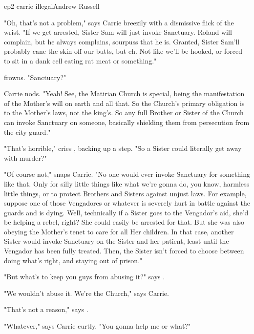\documentclass{book}
\begin{document}
\begin{childnode}{ep2 carrie illegal}{Andrew Russell}


    "Oh, that's not a problem," says Carrie breezily with a dismissive flick of the wrist. "If we get arrested, Sister Sam will just invoke Sanctuary. Roland will complain, but he always
    complains, sourpuss that he is. Granted, Sister Sam'll probably cane the skin off our butts, but eh. Not like we'll be hooked, or forced to sit in a dank cell eating rat meat or something." 

    \name{} frowns. "Sanctuary?"

    Carrie nods. "Yeah! See, the Matirian Church is special, being the manifestation of the Mother's will on earth and all that. So the Church's primary obligation is to the Mother's laws, not 
    the king's. So any full Brother or Sister of the Church can invoke Sanctuary on someone, basically shielding them from persecution from the city guard."

    "That's horrible," cries \name{}, backing up a step. "So a Sister could literally get away with murder?"

    "Of course not," snaps Carrie. "No one would ever invoke Sanctuary for something like that. Only for silly little things like what we're gonna do, you know, harmless little things, or 
    to protect Brothers and Sisters against unjust laws. For example, suppose one of those Vengadores or whatever is severely hurt in battle against the guards and is dying. Well, technically if
    a Sister goes to the Vengador's aid, she'd be helping a rebel, right? She could easily be arrested for that. But she was also obeying the Mother's tenet to care for all Her children. In that 
    case, another Sister would invoke Sanctuary on the Sister and her patient, least until the Vengador has been fully treated. Then, the Sister isn't forced to choose between doing
    what's right, and staying out of prison."

    "But what's to keep you guys from abusing it?" says \name{}.

    "We wouldn't abuse it. We're the Church," says Carrie.

    "That's not a reason," says \name{}.

    "Whatever," says Carrie curtly. "You gonna help me or what?" 




\end{childnode}
\end{document}
